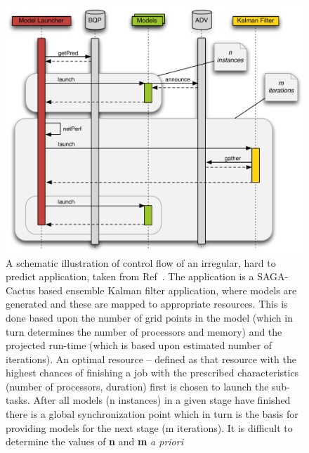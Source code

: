 \documentclass[a4paper,10pt]{article}
\begin{document}
\begin{figure}
\begin{center}
  \includegraphics[scale=0.4]{SequenceDiagram}
\end{center}
\caption{A schematic illustration of control flow of an irregular,
  hard to predict application, taken from Ref~\cite{saga_tg08}.  The
  application is a SAGA-Cactus based ensemble Kalman filter
  application, where models are generated and these are mapped to
  appropriate resources. This is done based upon the number of grid
  points in the model (which in turn determines the number of
  processors and memory) and the projected run-time (which is based
  upon estimated number of iterations).  An optimal resource --
  defined as that resource with the highest chances of finishing a job
  with the prescribed characteristics (number of processors, duration)
  first is chosen to launch the sub-tasks.  After all models (n
  instances) in a given stage have finished there is a global
  synchronization point which in turn is the basis for providing
  models for the next stage (m iterations). It is difficult to
  determine the values of {\bf n} and {\bf m} {\it a priori}}
\label{fig:controlflow}
\end{figure}

\end{document}
